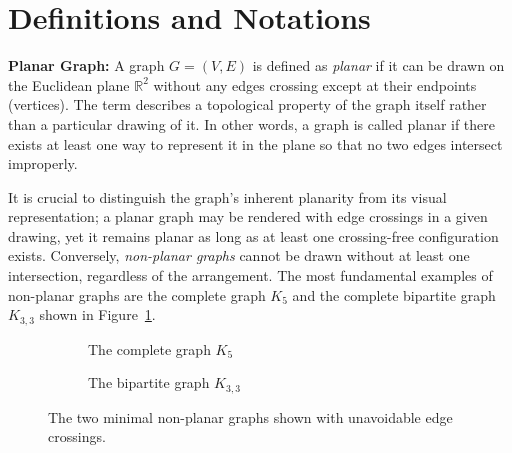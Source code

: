\section{Definitions and Notations}


\textbf{Planar Graph:} A graph $G = (V, E)$ is defined as \textit{planar} if it can be drawn on the Euclidean plane $\mathbb{R}^2$ without any edges crossing except at their endpoints (vertices). The term describes a topological property of the graph itself rather than a particular drawing of it. In other words, a graph is called planar if there exists at least one way to represent it in the plane so that no two edges intersect improperly.

It is crucial to distinguish the graph's inherent planarity from its visual representation; a planar graph may be rendered with edge crossings in a given drawing, yet it remains planar as long as at least one crossing-free configuration exists. Conversely, \textit{non-planar graphs} cannot be drawn without at least one intersection, regardless of the arrangement. The most fundamental examples of non-planar graphs are the complete graph $K_5$ and the complete bipartite graph $K_{3,3}$ shown in Figure~\ref{fig:nonplanar}.

\begin{figure}
\centering
\begin{subfigure}[t]{0.45\linewidth}
\centering
{}
\caption{The complete graph $K_5$}
\end{subfigure}
\hfill
\begin{subfigure}[t]{0.45\linewidth}
\centering
{}
\caption{The bipartite graph $K_{3,3}$}
\end{subfigure}
\caption{The two minimal non-planar graphs shown with unavoidable edge crossings.}
\label{fig:nonplanar}
\end{figure}

